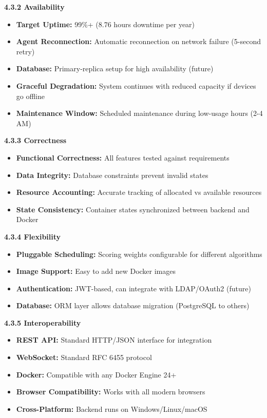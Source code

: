 \documentclass[12pt,a4paper]{article}
\begin{document}
\textbf{4.3.2 Availability}

\begin{itemize}[noitemsep]
    \item \textbf{Target Uptime:} 99\%+ (8.76 hours downtime per year)
    \item \textbf{Agent Reconnection:} Automatic reconnection on network failure (5-second retry)
    \item \textbf{Database:} Primary-replica setup for high availability (future)
    \item \textbf{Graceful Degradation:} System continues with reduced capacity if devices go offline
    \item \textbf{Maintenance Window:} Scheduled maintenance during low-usage hours (2-4 AM)
\end{itemize}

\textbf{4.3.3 Correctness}

\begin{itemize}[noitemsep]
    \item \textbf{Functional Correctness:} All features tested against requirements
    \item \textbf{Data Integrity:} Database constraints prevent invalid states
    \item \textbf{Resource Accounting:} Accurate tracking of allocated vs available resources
    \item \textbf{State Consistency:} Container states synchronized between backend and Docker
\end{itemize}

\textbf{4.3.4 Flexibility}

\begin{itemize}[noitemsep]
    \item \textbf{Pluggable Scheduling:} Scoring weights configurable for different algorithms
    \item \textbf{Image Support:} Easy to add new Docker images
    \item \textbf{Authentication:} JWT-based, can integrate with LDAP/OAuth2 (future)
    \item \textbf{Database:} ORM layer allows database migration (PostgreSQL to others)
\end{itemize}

\textbf{4.3.5 Interoperability}

\begin{itemize}[noitemsep]
    \item \textbf{REST API:} Standard HTTP/JSON interface for integration
    \item \textbf{WebSocket:} Standard RFC 6455 protocol
    \item \textbf{Docker:} Compatible with any Docker Engine 24+
    \item \textbf{Browser Compatibility:} Works with all modern browsers
    \item \textbf{Cross-Platform:} Backend runs on Windows/Linux/macOS
\end{itemize}
\end{document}
